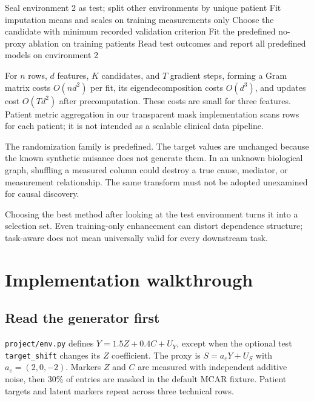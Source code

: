 \documentclass[11pt,oneside]{scrbook}
\begin{document}
\begin{algorithm}[ht]
\caption{Patient-split enhancement experiment (implemented)}
Seal environment 2 as test; split other environments by unique patient\;
Fit imputation means and scales on training measurements only\;
Choose the candidate with minimum recorded validation criterion\;
Fit the predefined no-proxy ablation on training patients\;
Read test outcomes and report all predefined models on environment 2\;
\end{algorithm}

For $n$ rows, $d$ features, $K$ candidates, and $T$ gradient steps, forming a Gram matrix
costs $O(nd^2)$ per fit, its eigendecomposition costs $O(d^3)$, and updates cost
$O(Td^2)$ after precomputation. These costs are small for three features. Patient
metric aggregation in our transparent mask implementation scans rows for each patient;
it is not intended as a scalable clinical data pipeline.

The randomization family is predefined. The target values are unchanged because
the known synthetic nuisance does not generate them. In an unknown biological graph,
shuffling a measured column could destroy a true cause, mediator, or measurement
relationship. The same transform must not be adopted unexamined for causal discovery.

\begin{pitfall}
Choosing the best method after looking at the test environment turns it into a
selection set. Even training-only enhancement can distort dependence structure;
task-aware does not mean universally valid for every downstream task.
\end{pitfall}

\chapter{Implementation walkthrough}
\section{Read the generator first}
\texttt{project/env.py} defines $Y=1.5Z+0.4C+U_Y$, except when the optional test
\texttt{target\_shift} changes its $Z$ coefficient. The proxy is
$S=a_eY+U_S$ with $a_e=(2,0,-2)$. Markers $Z$ and $C$ are measured with independent
additive noise, then 30\% of entries are masked in the default MCAR fixture.
Patient targets and latent markers repeat across three technical rows.
\end{document}
